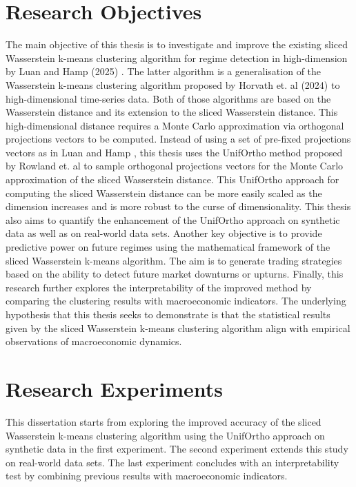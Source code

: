 \documentclass[12pt,a4paper]{report}
\begin{document}
\section{Research Objectives}
The main objective of this thesis is to investigate and improve the existing sliced Wasserstein k-means clustering algorithm for regime detection in high-dimension by Luan and Hamp (2025) \cite{LuanHamp2025}.
The latter algorithm is a generalisation of the Wasserstein k-means clustering algorithm proposed by Horvath et. al (2024) \cite{HorvathEtAl2024} to high-dimensional time-series data.
Both of those algorithms are based on the Wasserstein distance and its extension to the sliced Wasserstein distance. 
This high-dimensional distance requires a Monte Carlo approximation via orthogonal projections vectors to be computed. 
Instead of using a set of pre-fixed projections vectors as in Luan and Hamp \cite{LuanHamp2025}, this thesis uses the UnifOrtho method proposed by Rowland et. al \cite{RowlandEtAl2019} to sample orthogonal projections vectors for the Monte Carlo approximation of the sliced Wasserstein distance.
This UnifOrtho approach for computing the sliced Wasserstein distance can be more easily scaled as the dimension increases and is more robust to the curse of dimensionality.
This thesis also aims to quantify the enhancement of the UnifOrtho approach on synthetic data as well as on real-world data sets. 
Another key objective is to provide predictive power on future regimes using the mathematical framework of the sliced Wasserstein k-means algorithm.
The aim is to generate trading strategies based on the ability to detect future market downturns or upturns.
Finally, this research  further explores the interpretability of the improved method by comparing the clustering results with macroeconomic indicators.
The underlying hypothesis that this thesis seeks to demonstrate is that the statistical results given by the sliced Wasserstein k-means clustering algorithm align with empirical observations of macroeconomic dynamics. 







\section{Research Experiments}
This dissertation starts from exploring the improved accuracy of the sliced Wasserstein k-means clustering algorithm using the UnifOrtho approach 
on synthetic data in the first experiment. The second experiment extends this study on real-world data sets. The last experiment concludes with an interpretability test by combining previous results with macroeconomic indicators.
\end{document}
